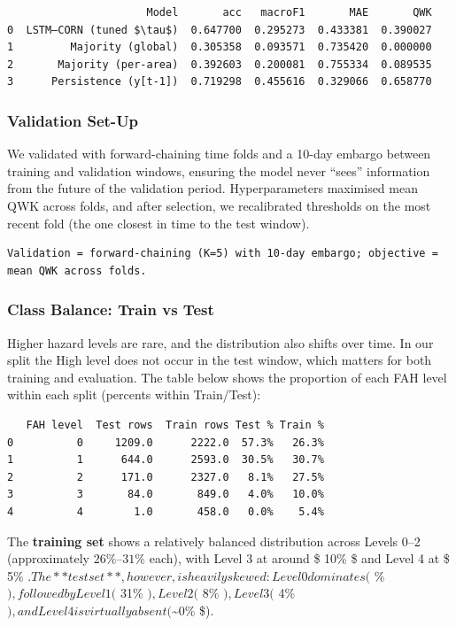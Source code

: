 \documentclass[
  letterpaper,
  DIV=11,
  numbers=noendperiod]{scrartcl}
\begin{document}
\begin{verbatim}
                      Model       acc   macroF1       MAE       QWK
0  LSTM–CORN (tuned $\tau$)  0.647700  0.295273  0.433381  0.390027
1         Majority (global)  0.305358  0.093571  0.735420  0.000000
2       Majority (per-area)  0.392603  0.200081  0.755334  0.089535
3      Persistence (y[t-1])  0.719298  0.455616  0.329066  0.658770
\end{verbatim}

\subsubsection{Validation Set-Up}\label{validation-set-up}

We validated with forward-chaining time folds and a 10-day embargo
between training and validation windows, ensuring the model never
``sees'' information from the future of the validation period.
Hyperparameters maximised mean QWK across folds, and after selection, we
recalibrated thresholds on the most recent fold (the one closest in time
to the test window).

\begin{verbatim}
Validation = forward-chaining (K=5) with 10-day embargo; objective = mean QWK across folds.
\end{verbatim}

\subsubsection{Class Balance: Train vs
Test}\label{class-balance-train-vs-test}

Higher hazard levels are rare, and the distribution also shifts over
time. In our split the High level does not occur in the test window,
which matters for both training and evaluation. The table below shows
the proportion of each FAH level within each split (percents within
Train/Test):

\begin{verbatim}
   FAH level  Test rows  Train rows Test % Train %
0          0     1209.0      2222.0  57.3%   26.3%
1          1      644.0      2593.0  30.5%   30.7%
2          2      171.0      2327.0   8.1%   27.5%
3          3       84.0       849.0   4.0%   10.0%
4          4        1.0       458.0   0.0%    5.4%
\end{verbatim}

The \textbf{training set} shows a relatively balanced distribution
across Levels 0--2 (approximately \(26\%\)--\(31\%\) each), with Level 3
at around \$ 10\% \$ and Level 4 at \$ 5\% \(.
The **test set**, however, is heavily skewed: Level 0 dominates (\)
\% \(), followed by Level 1 (\) 31\% \(), Level 2 (\) 8\%
\(), Level 3 (\) 4\% \(), and Level 4 is virtually absent (\)\sim 0\%
\$).
\end{document}
